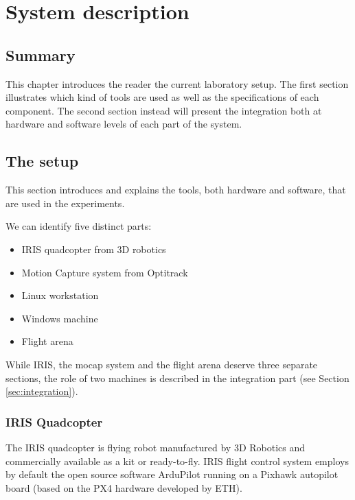 
\chapter{System description}
\label{chap:third}
\ifpdf
    \graphicspath{{Chapter3/Figures/PNG/}{Chapter3/Figures/PDF/}{Chapter3/Figures/}}
\else
    \graphicspath{{Chapter3/Figures/EPS/}{Chapter3/Figures/}}
\fi

\section*{Summary}

This chapter introduces the reader the current laboratory setup. The first section illustrates which kind of tools are used as well as the specifications of each component. The second section instead will present the integration both at hardware and software levels of each part of the system. 

\section{The setup}
\label{sec:setup}
This section introduces and explains the tools, both hardware and software, that are used in the experiments. 

We can identify five distinct parts:
\begin{itemize}
\item  IRIS quadcopter from 3D robotics
\item  Motion Capture system from Optitrack
\item  Linux workstation
\item  Windows machine
\item  Flight arena
\end{itemize}
While IRIS, the mocap system and the flight arena deserve three separate sections, the role of two machines is described in the integration part (see Section \ref{sec:integration}).

\subsection{IRIS Quadcopter}

The IRIS quadcopter is flying robot manufactured by 3D Robotics and commercially available as a kit or ready-to-fly. IRIS flight control system employs by default the open source software ArduPilot running on a Pixhawk autopilot board (based on the PX4 hardware developed by ETH).

